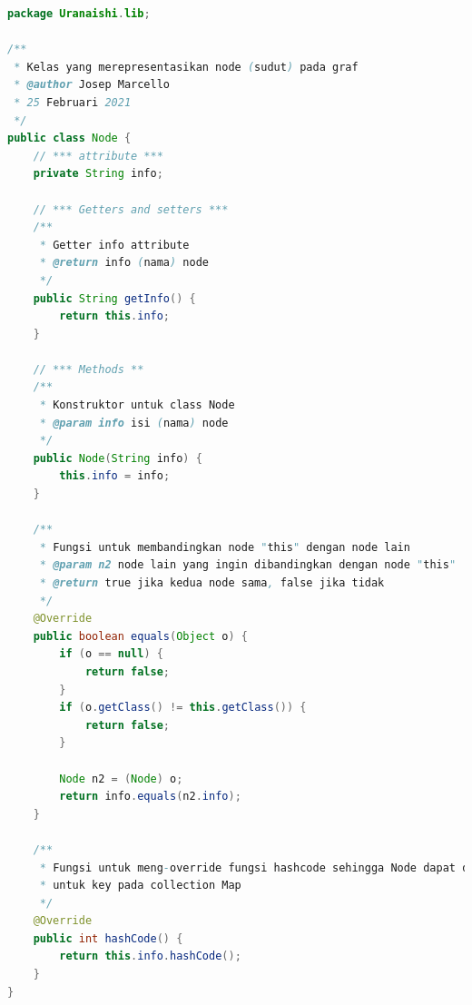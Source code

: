 \documentclass{article}
\begin{document}
\begin{lstlisting}[caption = lib/Node.java, language = java]
package Uranaishi.lib;

/**
 * Kelas yang merepresentasikan node (sudut) pada graf
 * @author Josep Marcello
 * 25 Februari 2021
 */
public class Node {
    // *** attribute ***
    private String info;

    // *** Getters and setters ***
    /**
     * Getter info attribute
     * @return info (nama) node
     */
    public String getInfo() {
        return this.info;
    }

    // *** Methods **
    /**
     * Konstruktor untuk class Node
     * @param info isi (nama) node
     */
    public Node(String info) {
        this.info = info;
    }

    /**
     * Fungsi untuk membandingkan node "this" dengan node lain
     * @param n2 node lain yang ingin dibandingkan dengan node "this"
     * @return true jika kedua node sama, false jika tidak
     */
    @Override
    public boolean equals(Object o) {
        if (o == null) {
            return false;
        }
        if (o.getClass() != this.getClass()) {
            return false;
        }

        Node n2 = (Node) o;
        return info.equals(n2.info);
    }

    /**
     * Fungsi untuk meng-override fungsi hashcode sehingga Node dapat digunakan
     * untuk key pada collection Map
     */
    @Override
    public int hashCode() {
        return this.info.hashCode();
    }
}
\end{lstlisting}
\end{document}
